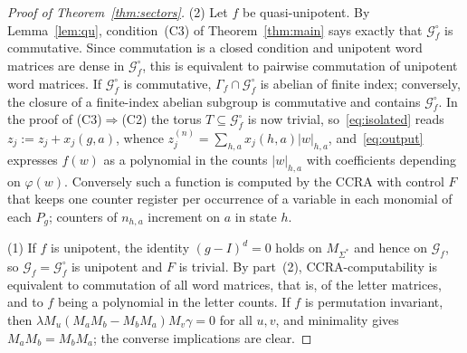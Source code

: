 \documentclass[11pt,letterpaper]{article}
\newcommand{\cG}{\mathcal{G}}
\theoremstyle{definition}
\begin{document}
\begin{proof}[Proof of Theorem~\ref{thm:sectors}]
(2) Let $f$ be quasi-unipotent. By Lemma~\ref{lem:qu}, condition~(C3) of Theorem~\ref{thm:main} says exactly that $\cG_f^\circ$ is commutative. Since commutation is a closed condition and unipotent word matrices are dense in $\cG_f^\circ$, this is equivalent to pairwise commutation of unipotent word matrices. If $\cG_f^\circ$ is commutative, $\Gamma_f\cap\cG_f^\circ$ is abelian of finite index; conversely, the closure of a finite-index abelian subgroup is commutative and contains $\cG_f^\circ$. In the proof of (C3)$\Rightarrow$(C2) the torus $T\subseteq\cG_f^\circ$ is now trivial, so~\eqref{eq:isolated} reads $z_j:=z_j+x_j(g,a)$, whence $z_j^{(n)}=\sum_{h,a}x_j(h,a)|w|_{h,a}$, and~\eqref{eq:output} expresses $f(w)$ as a polynomial in the counts $|w|_{h,a}$ with coefficients depending on $\varphi(w)$. Conversely such a function is computed by the CCRA with control $F$ that keeps one counter register per occurrence of a variable in each monomial of each $P_g$; counters of $n_{h,a}$ increment on $a$ in state $h$.

(1) If $f$ is unipotent, the identity $(g-I)^d=0$ holds on $M_{\Sigma^*}$ and hence on $\cG_f$, so $\cG_f=\cG_f^\circ$ is unipotent and $F$ is trivial. By part~(2), CCRA-computability is equivalent to commutation of all word matrices, that is, of the letter matrices, and to $f$ being a polynomial in the letter counts. If $f$ is permutation invariant, then $\lambda M_u(M_aM_b-M_bM_a)M_v\gamma=0$ for all $u,v$, and minimality gives $M_aM_b=M_bM_a$; the converse implications are clear.
\end{proof}
\end{document}
